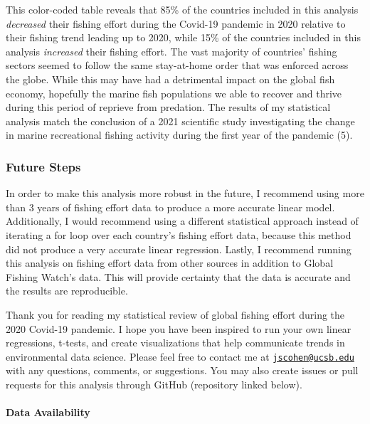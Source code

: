 \documentclass[
]{article}
\begin{document}
This color-coded table reveals that 85\% of the countries included in
this analysis \emph{decreased} their fishing effort during the Covid-19
pandemic in 2020 relative to their fishing trend leading up to 2020,
while 15\% of the countries included in this analysis \emph{increased}
their fishing effort. The vast majority of countries' fishing sectors
seemed to follow the same stay-at-home order that was enforced across
the globe. While this may have had a detrimental impact on the global
fish economy, hopefully the marine fish populations we able to recover
and thrive during this period of reprieve from predation. The results of
my statistical analysis match the conclusion of a 2021 scientific study
investigating the change in marine recreational fishing activity during
the first year of the pandemic (5).

\hypertarget{future-steps}{%
\subsubsection{Future Steps}\label{future-steps}}

In order to make this analysis more robust in the future, I recommend
using more than 3 years of fishing effort data to produce a more
accurate linear model. Additionally, I would recommend using a different
statistical approach instead of iterating a for loop over each country's
fishing effort data, because this method did not produce a very accurate
linear regression. Lastly, I recommend running this analysis on fishing
effort data from other sources in addition to Global Fishing Watch's
data. This will provide certainty that the data is accurate and the
results are reproducible.

Thank you for reading my statistical review of global fishing effort
during the 2020 Covid-19 pandemic. I hope you have been inspired to run
your own linear regressions, t-tests, and create visualizations that
help communicate trends in environmental data science. Please feel free
to contact me at
\href{mailto:jscohen@ucsb.edu}{\nolinkurl{jscohen@ucsb.edu}} with any
questions, comments, or suggestions. You may also create issues or pull
requests for this analysis through GitHub (repository linked below).

\hypertarget{data-availability}{%
\paragraph{Data Availability}\label{data-availability}}
\end{document}
